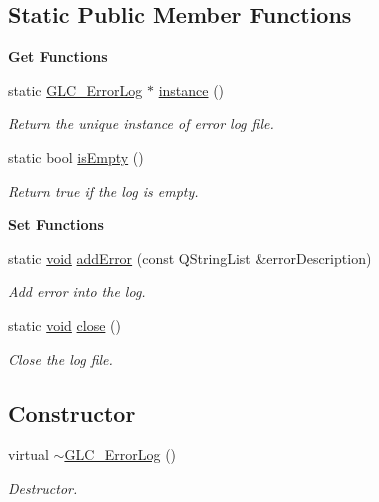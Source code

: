 \subsection*{Static Public Member Functions}
\begin{Indent}{\bf Get Functions}\par
\begin{DoxyCompactItemize}
\item 
static \hyperlink{class_g_l_c___error_log}{G\-L\-C\-\_\-\-Error\-Log} $\ast$ \hyperlink{class_g_l_c___error_log_a35d7719788b472f43083c412b61b1e7d}{instance} ()
\begin{DoxyCompactList}\small\item\em Return the unique instance of error log file. \end{DoxyCompactList}\item 
static bool \hyperlink{class_g_l_c___error_log_aed8fc96e119f637210e1f55a291757ca}{is\-Empty} ()
\begin{DoxyCompactList}\small\item\em Return true if the log is empty. \end{DoxyCompactList}\end{DoxyCompactItemize}
\end{Indent}
\begin{Indent}{\bf Set Functions}\par
\begin{DoxyCompactItemize}
\item 
static \hyperlink{group___u_a_v_objects_plugin_ga444cf2ff3f0ecbe028adce838d373f5c}{void} \hyperlink{class_g_l_c___error_log_aa3c98a2c8848e0d4ac58123c1c30d7cd}{add\-Error} (const Q\-String\-List \&error\-Description)
\begin{DoxyCompactList}\small\item\em Add error into the log. \end{DoxyCompactList}\item 
static \hyperlink{group___u_a_v_objects_plugin_ga444cf2ff3f0ecbe028adce838d373f5c}{void} \hyperlink{class_g_l_c___error_log_ac537aeb3f639f4eaba0212424831aef1}{close} ()
\begin{DoxyCompactList}\small\item\em Close the log file. \end{DoxyCompactList}\end{DoxyCompactItemize}
\end{Indent}
\subsection*{Constructor}
\begin{DoxyCompactItemize}
\item 
virtual \hyperlink{class_g_l_c___error_log_af72e3b52f2b255e3c5b0d6ce9ebe0ccf}{$\sim$\-G\-L\-C\-\_\-\-Error\-Log} ()
\begin{DoxyCompactList}\small\item\em Destructor. \end{DoxyCompactList}\end{DoxyCompactItemize}
